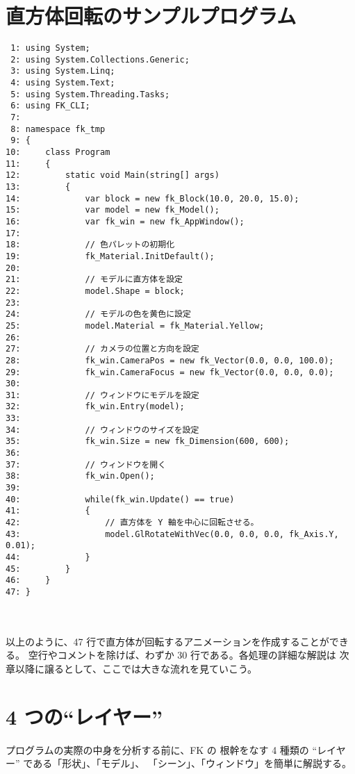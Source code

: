 \section{直方体回転のサンプルプログラム}
\begin{breakbox}
\begin{small}
\begin{verbatim}
 1: using System;
 2: using System.Collections.Generic;
 3: using System.Linq;
 4: using System.Text;
 5: using System.Threading.Tasks;
 6: using FK_CLI;
 7: 
 8: namespace fk_tmp
 9: {
10:     class Program
11:     {
12:         static void Main(string[] args)
13:         {
14:             var block = new fk_Block(10.0, 20.0, 15.0);
15:             var model = new fk_Model();
16:             var fk_win = new fk_AppWindow();
17: 
18:             // 色パレットの初期化
19:             fk_Material.InitDefault();
20: 
21:             // モデルに直方体を設定
22:             model.Shape = block;
23: 
24:             // モデルの色を黄色に設定
25:             model.Material = fk_Material.Yellow;
26: 
27:             // カメラの位置と方向を設定
28:             fk_win.CameraPos = new fk_Vector(0.0, 0.0, 100.0);
29:             fk_win.CameraFocus = new fk_Vector(0.0, 0.0, 0.0);
30: 
31:             // ウィンドウにモデルを設定
32:             fk_win.Entry(model);
33: 
34:             // ウィンドウのサイズを設定
35:             fk_win.Size = new fk_Dimension(600, 600);
36: 
37:             // ウィンドウを開く
38:             fk_win.Open();
39: 
40:             while(fk_win.Update() == true)
41:             {
42:                 // 直方体を Y 軸を中心に回転させる。
43:                 model.GlRotateWithVec(0.0, 0.0, 0.0, fk_Axis.Y, 0.01);
44:             }
45:         }
46:     }
47: }
\end{verbatim}
\end{small}
\end{breakbox}

~ \\ ~ \\
以上のように、47 行で直方体が回転するアニメーションを作成することができる。
空行やコメントを除けば、わずか 30 行である。各処理の詳細な解説は
次章以降に譲るとして、ここでは大きな流れを見ていこう。

\section{4 つの``レイヤー''}
プログラムの実際の中身を分析する前に、FK の
根幹をなす 4 種類の ``レイヤー'' である「形状」、「モデル」、
「シーン」、「ウィンドウ」を簡単に解説する。

